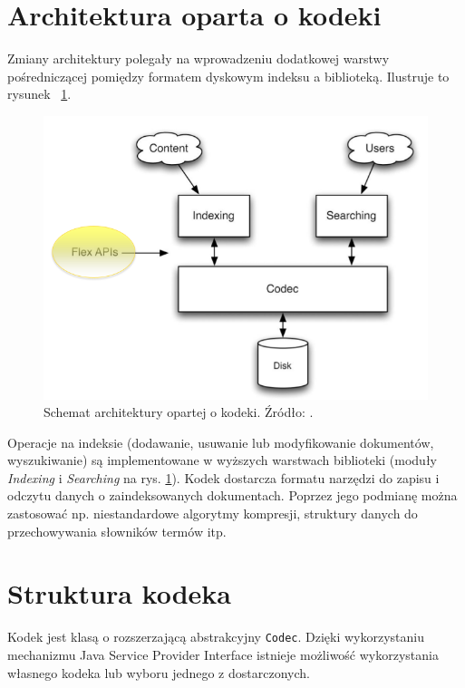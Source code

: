 \section{Architektura oparta o kodeki}

Zmiany architektury polegały na wprowadzeniu dodatkowej warstwy pośredniczącej pomiędzy formatem dyskowym indeksu a biblioteką. Ilustruje to rysunek ~\ref{fig:newarchitecture}.

\begin{figure}[here]
 \includegraphics[scale=0.5]{pictures/architecture.png}
 \caption{Schemat architektury opartej o kodeki. Źródło: \cite{flexindex}.\label{fig:newarchitecture}}
\end{figure}

Operacje na indeksie (dodawanie, usuwanie lub modyfikowanie dokumentów, wyszukiwanie) są implementowane w wyższych warstwach biblioteki (moduły \emph{Indexing} i \emph{Searching} na rys. \ref{fig:newarchitecture}). Kodek dostarcza formatu narzędzi do zapisu i odczytu danych o zaindeksowanych dokumentach. Poprzez jego podmianę można zastosować np. niestandardowe algorytmy kompresji, struktury danych do przechowywania słowników termów itp.

\section{Struktura kodeka}
\label{sec:codecStructure}

Kodek jest klasą o rozszerzającą abstrakcyjny \texttt{Codec}. Dzięki wykorzystaniu mechanizmu Java Service Provider Interface istnieje możliwość wykorzystania własnego kodeka lub wyboru jednego z dostarczonych.

